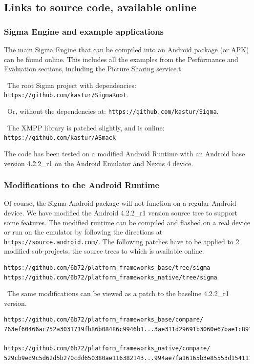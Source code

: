 \documentclass[prodmode]{acmlarge}
\begin{document}
\subsection{Links to source code, available online}
\label{app:SourceCode}

\subsubsection{Sigma Engine and example applications}
The main Sigma Engine that can be compiled into an Android package (or APK) can be found online. This includes all the examples from the Performance and Evaluation sections, including the Picture Sharing service.t

\noindent~The root Sigma project with dependencies: \verb|https://github.com/kastur/SigmaRoot|.

\noindent~Or, without the dependencies at: \verb|https://github.com/kastur/Sigma|.

\noindent~The XMPP library is patched slightly, and is online: \verb|https://github.com/kastur/ASmack|

The code has been tested on a modified Android Runtime with an Android base version 4.2.2\_r1 on the Android Emulator and Nexus 4 device.

\subsubsection{Modifications to the Android Runtime}
Of course, the Sigma Android package will not function on a regular Android device. We have modified the Android 4.2.2\_r1 version source tree to support some features. The modified runtime can be compiled and flashed on a real device or run on the emulator by following the directions at \verb|https://source.android.com/|. The following patches have to be applied to 2 modified sub-projects, the source trees to which is available online:

\begin{Verbatim}
https://github.com/6b72/platform_frameworks_base/tree/sigma
https://github.com/6b72/platform_frameworks_native/tree/sigma
\end{Verbatim}

\noindent~The same modifications can be viewed as a patch to the baseline 4.2.2\_r1 version.
\begin{Verbatim}
https://github.com/6b72/platform_frameworks_base/compare/
763ef60466ac752a3031719fb86b08486c9946b1...3ae311d29691b3060e67bae1c891fb8fbbc1be0f

https://github.com/6b72/platform_frameworks_native/compare/
529cb9ed9c5d62d5b270cdd650380ae116382143...994ae7fa16165b3e85553d154111df0a2f5a5af3
\end{Verbatim}
\end{document}

